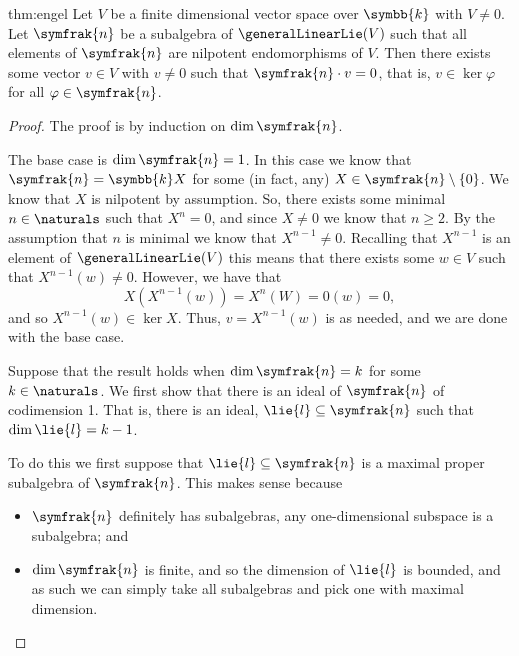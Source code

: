 \documentclass[fleqn]{NotesClass}
\renewcommand{\field}{\symbb{k}}
\newcommand{\nilpotentLie}{\symfrak{n}}
\begin{document}
    \begin{thm}{}{thm:engel}
        Let \(V\) be a finite dimensional vector space over \(\field\) with \(V \ne 0\).
        Let \(\nilpotentLie\) be a subalgebra of \(\generalLinearLie(V)\) such that all elements of \(\nilpotentLie\) are nilpotent endomorphisms of \(V\).
        Then there exists some vector \(v \in V\) with \(v \ne 0\) such that \(\nilpotentLie \cdot v = 0\), that is, \(v \in \ker \varphi\) for all \(\varphi \in \nilpotentLie\).
        \begin{proof}
            The proof is by induction on \(\dim \nilpotentLie\).
            
            The base case is \(\dim \nilpotentLie = 1\).
            In this case we know that \(\nilpotentLie = \field X\) for some (in fact, any) \(X \in \nilpotentLie \setminus \{0\}\).
            We know that \(X\) is nilpotent by assumption.
            So, there exists some minimal \(n \in \naturals\) such that \(X^n = 0\), and since \(X \ne 0\) we know that \(n \ge 2\).
            By the assumption that \(n\) is minimal we know that \(X^{n-1} \ne 0\).
            Recalling that \(X^{n-1}\) is an element of \(\generalLinearLie(V)\) this means that there exists some \(w \in V\) such that \(X^{n-1}(w) \ne 0\).
            However, we have that
            \begin{equation}
                X(X^{n-1}(w)) = X^n(W) = 0(w) = 0,
            \end{equation}
            and so \(X^{n-1}(w) \in \ker X\).
            Thus, \(v = X^{n-1}(w)\) is as needed, and we are done with the base case.
            
            Suppose that the result holds when \(\dim \nilpotentLie = k\) for some \(k \in \naturals\).
            We first show that there is an ideal of \(\nilpotentLie\) of codimension 1.
            That is, there is an ideal, \(\lie{l} \subseteq \nilpotentLie\) such that \(\dim \lie{l} = k - 1\).
            
            To do this we first suppose that \(\lie{l} \subseteq \nilpotentLie\) is a maximal proper subalgebra of \(\nilpotentLie\).
            This makes sense because
            \begin{itemize}
                \item \(\nilpotentLie\) definitely has subalgebras, any one-dimensional subspace is a subalgebra; and
                \item \(\dim \nilpotentLie\) is finite, and so the dimension of \(\lie{l}\) is bounded, and as such we can simply take all subalgebras and pick one with maximal dimension.
            \end{itemize}
            

\end{proof}
\end{thm}
\end{document}
